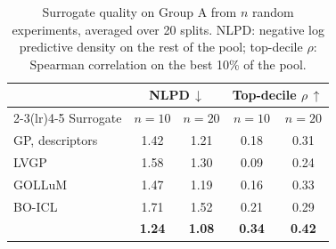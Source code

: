 \begin{table}[t]
\centering
\small
\setlength{\tabcolsep}{4.5pt}
\begin{tabular}{@{}l cc cc@{}}
\toprule
 & \multicolumn{2}{c}{NLPD\,$\downarrow$} & \multicolumn{2}{c}{Top-decile $\rho$\,$\uparrow$} \\
\cmidrule(lr){2-3}\cmidrule(lr){4-5}
Surrogate & $n{=}10$ & $n{=}20$ & $n{=}10$ & $n{=}20$ \\
\midrule
GP, descriptors & 1.42 & 1.21 & 0.18 & 0.31 \\
LVGP & 1.58 & 1.30 & 0.09 & 0.24 \\
GOLLuM & 1.47 & 1.19 & 0.16 & 0.33 \\
BO-ICL & 1.71 & 1.52 & 0.21 & 0.29 \\
\rowcolor{tacitrow}
\ours{} & \textbf{1.24} & \textbf{1.08} & \textbf{0.34} & \textbf{0.42} \\
\bottomrule
\end{tabular}
\caption{Surrogate quality on Group A from $n$ random experiments, averaged over 20 splits. NLPD: negative log predictive density on the rest of the pool; top-decile $\rho$: Spearman correlation on the best 10\% of the pool.}
\label{tab:surrogate}
\end{table}
